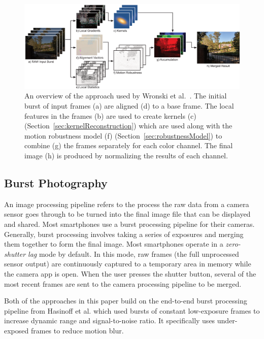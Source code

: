 \documentclass{sig-alternate}
\begin{document}
\begin{figure}[t]
\centering
\includegraphics[width=\textwidth]{Wronski2019-figure-2}
\caption{An overview of the approach used by Wronski et al.~\cite{Wronski2019}. The initial burst of input frames (a) are aligned (d) to a base frame. The local features in the frames (b) are used to create kernels (c) (Section~\ref{sec:kernelReconstruction}) which are used along with the motion robustness model (f) (Section~\ref{sec:robustnessModel}) to combine (g) the frames separately for each color channel. The final image (h) is produced by normalizing the results of each channel.}
\label{fig:Wronski2019Fig2}
\end{figure}

\pagebreak

\subsection{Burst Photography}
\label{sec:background:burstPhotography}

An image processing pipeline refers to the process the raw data from a camera sensor goes through to be turned into the final image file that can be displayed and shared. 
Most smartphones use a burst processing pipeline for their cameras. Generally, burst processing involves taking a series of exposures and merging them together to form the final image. Most smartphones operate in a \emph{zero-shutter lag} mode by default. In this mode, raw frames (the full unprocessed sensor output) are continuously captured to a temporary area in memory while the camera app is open. When the user presses the shutter button, several of the most recent frames are sent to the camera processing pipeline to be merged.

Both of the approaches in this paper build on the end-to-end burst processing pipeline from Hasinoff et al. \cite{Hasinoff2016} which used bursts of constant low-exposure frames to increase dynamic range and signal-to-noise ratio. It specifically uses under-exposed frames to reduce motion blur.
\end{document}
